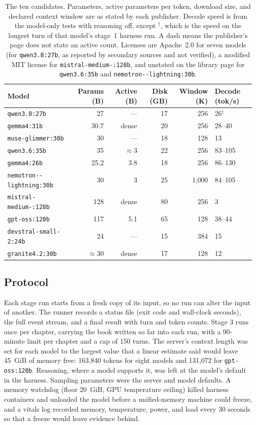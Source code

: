 \documentclass[11pt]{article}
\newcommand{\mdl}[1]{\texttt{#1}}
\newcommand{\Qeight}{\mdl{qwen3.8:27b}}
\newcommand{\Gthirtyone}{\mdl{gemma4:31b}}
\newcommand{\Muse}{\mdl{muse-\allowbreak glimmer:30b}}
\newcommand{\Qsix}{\mdl{qwen3.6:35b}}
\newcommand{\Gtwentysix}{\mdl{gemma4:26b}}
\newcommand{\Nemo}{\mdl{nemotron-\allowbreak 3.5-\allowbreak lightning:30b}}
\newcommand{\Mistral}{\mdl{mistral-\allowbreak medium-\allowbreak 3.5:128b}}
\newcommand{\Gptoss}{\mdl{gpt-oss:120b}}
\newcommand{\Devstral}{\mdl{devstral-\allowbreak small-2:24b}}
\newcommand{\Granite}{\mdl{granite4.2:30b}}
\begin{document}
\begin{table}[htbp]
\centering
\footnotesize
\begin{tabular}{@{}lrrrrl@{}}
\toprule
\textbf{Model} & \textbf{Params (B)} & \textbf{Active (B)} & \textbf{Disk (GB)} & \textbf{Window (K)} & \textbf{Decode (tok/s)} \\
\midrule
\Qeight & 27 & --- & 17 & 256 & 26$^\dagger$ \\
\Gthirtyone & 30.7 & dense & 20 & 256 & 28--40 \\
\Muse & 30 & --- & 18 & 128 & 13 \\
\Qsix & 35 & $\approx$3 & 22 & 256 & 83--105 \\
\Gtwentysix & 25.2 & 3.8 & 18 & 256 & 86--130 \\
\Nemo & 30 & 3 & 25 & 1,000 & 84--105 \\
\Mistral & 128 & dense & 80 & 256 & 3 \\
\Gptoss & 117 & 5.1 & 65 & 128 & 38--44 \\
\Devstral & 24 & --- & 15 & 384 & 15 \\
\Granite & $\approx$30 & dense & 17 & 128 & 12 \\
\bottomrule
\end{tabular}
\caption{The ten candidates. Parameters, active parameters per token, download size, and declared context window are as stated by each publisher. Decode speed is from the model-only tests with reasoning off, except $^\dagger$, which is the speed on the longest turn of that model's stage~1 harness run. A dash means the publisher's page does not state an active count. Licenses are Apache~2.0 for seven models (for \Qeight, as reported by secondary sources and not verified), a modified MIT license for \Mistral, and unstated on the library page for \Qsix{} and \Nemo.}
\label{tab:models}
\end{table}

\subsection{Protocol}

Each stage run starts from a fresh copy of its input, so no run can alter the input of another. The runner records a status file (exit code and wall-clock seconds), the full event stream, and a final result with turn and token counts. Stage 3 runs once per chapter, carrying the book written so far into each run, with a 90-minute limit per chapter and a cap of 150 turns. The server's context length was set for each model to the largest value that a linear estimate said would leave 45~GiB of memory free: 163,840 tokens for eight models and 131,072 for \Gptoss. Reasoning, where a model supports it, was left at the model's default in the harness. Sampling parameters were the server and model defaults. A memory watchdog (floor 20~GiB, GPU temperature ceiling) killed harness containers and unloaded the model before a unified-memory machine could freeze, and a vitals log recorded memory, temperature, power, and load every 30 seconds so that a freeze would leave evidence behind.
\end{document}
